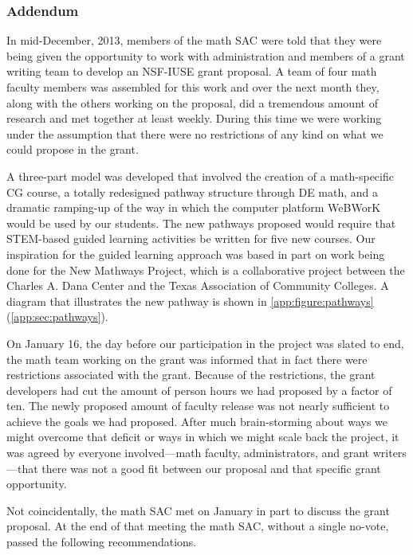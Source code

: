 \subsubsection{Addendum}\label{over:subsub:nsfiuse}
In mid-December, 2013, members of the math SAC were told that they were being
given the opportunity to work with administration and members of a grant writing
team to develop an NSF-IUSE grant proposal.  A team of four math faculty members
was assembled for this work and over the next month they, along with the others
working on the proposal, did a tremendous amount of research and met together at
least weekly.  During this time we were working under the assumption that there
were no restrictions of any kind on what we could propose in the grant.  

A three-part model was developed that involved the creation of a math-specific
CG course, a totally redesigned pathway structure through DE math, and a
dramatic ramping-up of the way in which the computer platform WeBWorK would be
used by our students.  The new pathways proposed would require that STEM-based
guided learning activities be written for five new courses.  Our inspiration for
the guided learning approach was based in part on work being done for the New
Mathways Project,  which is a collaborative project between the Charles A. Dana
Center and the Texas Association of Community Colleges. A diagram that
illustrates the new pathway is shown in \cref{app:figure:pathways}
(\vref{app:sec:pathways}).

On January 16, the day before our participation in the project was slated to
end, the math team working on the grant was informed that in fact there were
restrictions associated with the grant.  Because of the restrictions, the grant
developers had cut the amount of person hours we had proposed by a factor of
ten.  The newly proposed amount of faculty release was not nearly sufficient to
achieve the goals we had proposed.  After much brain-storming about ways we
might overcome that deficit or ways in which we might scale back the project, it
was agreed by everyone involved---math faculty, administrators, and grant
writers---that there was not a good fit between our proposal and that specific
grant opportunity.

Not coincidentally, the math SAC met on January  in part to discuss the grant
proposal.  At the end of that meeting the math SAC, without a single no-vote,
passed the following recommendations.


